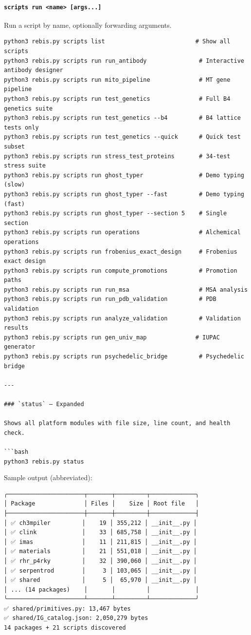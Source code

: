 \hypertarget{scripts-run-name-args...}{%
\paragraph{\texorpdfstring{\texttt{scripts\ run\ \textless{}name\textgreater{}\ {[}args...{]}}}{scripts run \textless name\textgreater{} {[}args...{]}}}\label{scripts-run-name-args...}}

Run a script by name, optionally forwarding arguments.

\begin{verbatim}
python3 rebis.py scripts list                          # Show all scripts
python3 rebis.py scripts run run_antibody               # Interactive antibody designer
python3 rebis.py scripts run mito_pipeline              # MT gene pipeline
python3 rebis.py scripts run test_genetics              # Full B4 genetics suite
python3 rebis.py scripts run test_genetics --b4         # B4 lattice tests only
python3 rebis.py scripts run test_genetics --quick      # Quick test subset
python3 rebis.py scripts run stress_test_proteins       # 34-test stress suite
python3 rebis.py scripts run ghost_typer                # Demo typing (slow)
python3 rebis.py scripts run ghost_typer --fast         # Demo typing (fast)
python3 rebis.py scripts run ghost_typer --section 5    # Single section
python3 rebis.py scripts run operations                 # Alchemical operations
python3 rebis.py scripts run frobenius_exact_design     # Frobenius exact design
python3 rebis.py scripts run compute_promotions         # Promotion paths
python3 rebis.py scripts run run_msa                    # MSA analysis
python3 rebis.py scripts run run_pdb_validation         # PDB validation
python3 rebis.py scripts run analyze_validation         # Validation results
python3 rebis.py scripts run gen_univ_map              # IUPAC generator
python3 rebis.py scripts run psychedelic_bridge         # Psychedelic bridge

---

### `status` — Expanded

Shows all platform modules with file size, line count, and health check.

```bash
python3 rebis.py status
\end{verbatim}

Sample output (abbreviated):

\begin{verbatim}
╭──────────────────────┬───────┬─────────┬─────────────╮
│ Package              │ Files │    Size │ Root file   │
├──────────────────────┼───────┼─────────┼─────────────┤
│ ✅ ch3mpiler         │    19 │ 355,212 │ __init__.py │
│ ✅ clink             │    33 │ 685,758 │ __init__.py │
│ ✅ imas              │    11 │ 211,815 │ __init__.py │
│ ✅ materials         │    21 │ 551,018 │ __init__.py │
│ ✅ rhr_p4rky         │    32 │ 390,060 │ __init__.py │
│ ✅ serpentrod        │     3 │ 103,065 │ __init__.py │
│ ✅ shared            │     5 │  65,970 │ __init__.py │
│ ... (14 packages)    │       │         │             │
╰──────────────────────┴───────┴─────────┴─────────────╯
✅ shared/primitives.py: 13,467 bytes
✅ shared/IG_catalog.json: 2,050,279 bytes
14 packages + 21 scripts discovered
\end{verbatim}

